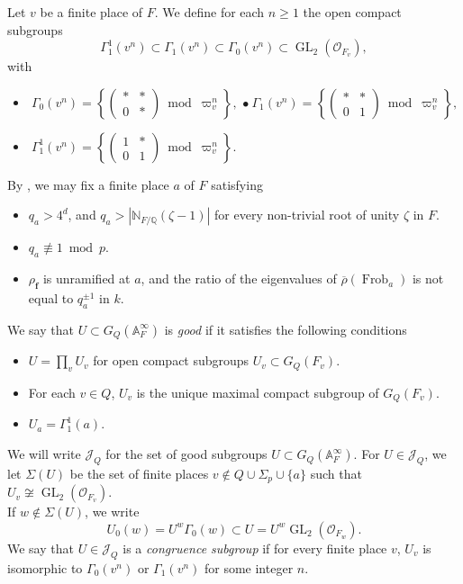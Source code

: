 \documentclass[a4paper, notitlepage, 10pt]{amsart}
\theoremstyle{plain} %
\theoremstyle{definition} %
\theoremstyle{remark} %
\numberwithin{equation}{section}
\newcommand{\bbN}{\mathbb N}
\newcommand{\bbQ}{\mathbb Q}
\newcommand{\GL}{\operatorname{GL}} %
\newcommand{\Frob}{\operatorname{Frob}} %
\begin{document}
 Let $v$ be a finite place of $F$. We define for each $n\ge 1$ the open compact subgroups
\begin{equation*}%
    \Gamma_1^1(v^n)\subset \Gamma_1(v^n)\subset \Gamma_0(v^n) \subset \GL_2(\mathcal{O}_{F_v}),
\end{equation*}
with
\begin{itemize} \vspace{-6pt}
\item  $\ \Gamma_0(v^n)= \left\{\begin{pmatrix} *& * \\ 0 & * \end{pmatrix} \bmod \varpi^n_v \right\}, $ \quad \quad \quad $\bullet \ \Gamma_1(v^n)= \left\{\begin{pmatrix} * & * \\ 0 & 1 \end{pmatrix} \bmod \varpi^n_v \right\}, $
    \item $ \  \Gamma_1^1(v^n)= \left\{\begin{pmatrix} 1& * \\ 0 & 1 \end{pmatrix} \bmod \varpi^n_v \right\}.$
\end{itemize}
By \cite[Lemma 4.11]{DDT}, we may fix a finite place $a$ of $F$ satisfying 
\begin{itemize}
    \item $q_a>4^d$, and $q_a>|\bbN_{F/\bbQ}(\zeta-1)|$ for every non-trivial root of unity $\zeta$ in $F$.
    \item $q_a\not\equiv 1 \bmod p$.
    \item $\rho_{\mathbf{f}}$ is unramified at $a$, and the ratio of the eigenvalues of $\overline{\rho}(\Frob_a)$ is not equal to $q_a^{\pm 1}$ in $k$.
\end{itemize}
We say that $U\subset G_{Q}(\mathbb{A}_F^\infty)$ is \emph{good} if it satisfies the following conditions
\begin{itemize}
    \item $U=\prod_v U_v$ for open compact subgroups $U_v\subset G_{Q}(F_v)$.
    \item For each $v\in Q$, $U_v$ is the unique maximal compact subgroup of $G_{Q}(F_v)$.
    \item $U_a=\Gamma_1^1(a)$.
\end{itemize}
We will write $\mathcal{J}_Q$ for the set of good subgroups $U\subset G_Q(\mathbb{A}^\infty_F)$. For $U\in \mathcal{J}_Q$, we let $\Sigma(U)$ be the set of finite places $v\not \in Q\cup \Sigma_p\cup \{a\}$ such that $U_v\not\cong \GL_2(\mathcal{O}_{F_v})$. 
\\ If $w\not \in \Sigma(U)$, we write 
$$ U_0(w)= U^w \Gamma_0(w) \subset U= U^w\GL_2(\mathcal{O}_{F_w}). $$
We say that $U\in \mathcal{J}_Q$ is a \emph{congruence subgroup} if for every finite place $v$, $U_v$ is isomorphic to $\Gamma_0(v^n)$ or $\Gamma_1(v^n)$ for some integer $n$. 
\end{document}
